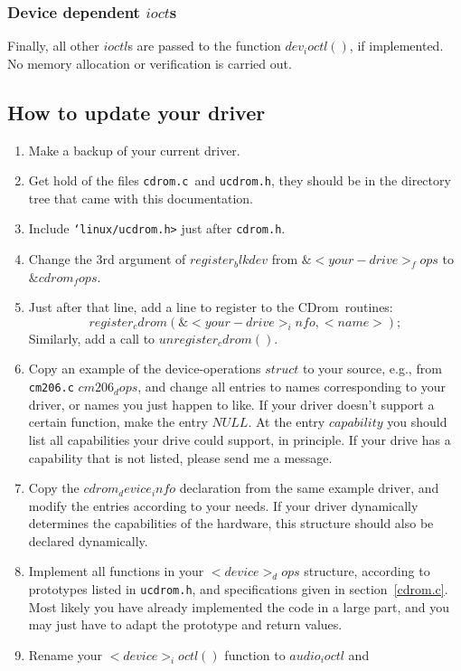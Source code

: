\documentclass{article}
\def\cdrom{{\sc CDrom}}
\def\cdromc{{\tt cdrom.c}}
\def\ucdrom{{\tt ucdrom.h}}
\begin{document}
\subsubsection{Device dependent $ioct$s}

Finally, all other $ioctl$s are passed to the function $dev_ioctl()$,
if implemented. No memory allocation or verification is carried out. 

\subsection{How to update your driver}

\begin{enumerate}
\item Make a backup of your current driver. 
\item Get hold of the files \cdromc\ and \ucdrom, they should be in
  the directory tree that came with this documentation.
\item Include {\tt \char`\<linux/ucdrom.h>} just after {\tt cdrom.h}.
\item Change the 3rd argument of $register_blkdev$ from
$\&<your-drive>_fops$ to $\&cdrom_fops$. 
\item Just after that line, add a line to register to the \cdrom\ 
  routines:
  $$register_cdrom(\&<your-drive>_info, <name>);$$
  Similarly, add a
  call to $unregister_cdrom()$.
\item Copy an example of the device-operations $struct$ to your
  source, e.g., from {\tt cm206.c} $cm206_dops$, and change all
  entries to names corresponding to your driver, or names you just
  happen to like. If your driver doesn't support a certain function,
  make the entry $NULL$. At the entry $capability$ you should list all
  capabilities your drive could support, in principle. If your drive
  has a capability that is not listed, please send me a message.
\item Copy the $cdrom_device_info$ declaration from the same example
  driver, and modify the entries according to your needs. If your
  driver dynamically determines the capabilities of the hardware, this
  structure should also be declared dynamically. 
\item Implement all functions in your $<device>_dops$ structure,
  according to prototypes listed in \ucdrom, and specifications given
  in section~\ref{cdrom.c}. Most likely you have already implemented
  the code in a large part, and you may just have to adapt the
  prototype and return values.
\item Rename your $<device>_ioctl()$ function to $audio_ioctl$ and

\end{enumerate}
\end{document}
